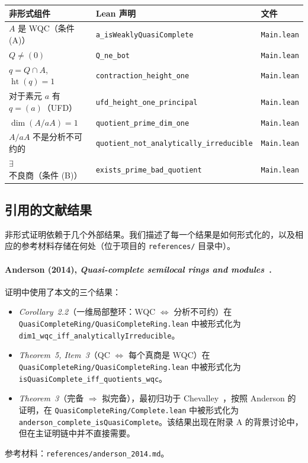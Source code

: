 ﻿\documentclass[]{pkuai4m}
\theoremstyle{plain}
\theoremstyle{definition}
\begin{document}
\begin{center}
\small
\begin{tabular}{p{5.5cm} l l}
\toprule
\textbf{非形式组件} & \textbf{Lean 声明} & \textbf{文件} \\
\midrule
$A$ 是 WQC（条件 (A)） & \texttt{a\_isWeaklyQuasiComplete} & \texttt{Main.lean} \\
$Q \ne (0)$ & \texttt{Q\_ne\_bot} & \texttt{Main.lean} \\
$q = Q \cap A$, $\operatorname{ht}(q) = 1$ & \texttt{contraction\_height\_one} & \texttt{Main.lean} \\
对于素元 $a$ 有 $q = (a)$（UFD） & \texttt{ufd\_height\_one\_principal} & \texttt{Main.lean} \\
$\dim(A/aA) = 1$ & \texttt{quotient\_prime\_dim\_one} & \texttt{Main.lean} \\
$A/aA$ 不是分析不可约的 & \texttt{quotient\_not\_analytically\_irreducible} & \texttt{Main.lean} \\
$\exists$ 不良商（条件 (B)） & \texttt{exists\_prime\_bad\_quotient} & \texttt{Main.lean} \\
\bottomrule
\end{tabular}
\end{center}

\subsection*{引用的文献结果}

非形式证明依赖于几个外部结果。我们描述了每一个结果是如何形式化的，以及相应的参考材料存储在何处（位于项目的 \texttt{references/} 目录中）。

\paragraph{Anderson (2014), \emph{Quasi-complete semilocal rings and modules}~\cite{anderson2014quasi}.}

证明中使用了本文的三个结果：
\begin{itemize}
\item \emph{Corollary~2.2}（一维局部整环：WQC $\Leftrightarrow$ 分析不可约）在 \texttt{QuasiCompleteRing/QuasiCompleteRing.lean} 中被形式化为 \texttt{dim1\_wqc\_iff\_analyticallyIrreducible}。
\item \emph{Theorem~5, Item~3}（QC $\Leftrightarrow$ 每个真商是 WQC）在 \texttt{QuasiCompleteRing/QuasiCompleteRing.lean} 中被形式化为 \texttt{isQuasiComplete\_iff\_quotients\_wqc}。
\item \emph{Theorem~3}（完备 $\Rightarrow$ 拟完备），最初归功于 Chevalley~\cite{chevalley1943theory}，按照 Anderson 的证明，在 \texttt{QuasiCompleteRing/Complete.lean} 中被形式化为 \texttt{anderson\_complete\_isQuasiComplete}。该结果出现在附录 A 的背景讨论中，但在主证明链中并不直接需要。
\end{itemize}
参考材料：\texttt{references/anderson\_2014.md}。
\end{document}
